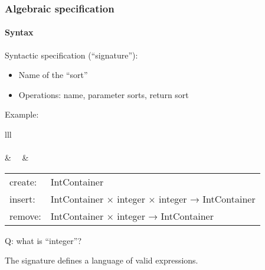 \documentclass{beamer}
\begin{document}
\begin{frame}[fragile]
\frametitle{Algebraic specification}
\framesubtitle{Syntax}

Syntactic specification (``signature''):
\begin{itemize}
\item Name of the ``sort''
\item Operations: name, parameter sorts, return sort
\end{itemize}
\bigskip

Example:
\begin{tabular}{lll}
\\
\\
 & \ \ & 
   \begin{tabular}{ll}
   create:& IntContainer\\
   insert:& IntContainer × integer × integer → IntContainer\\
   remove:& IntContainer × integer → IntContainer \\
   \end{tabular}
\end{tabular} 
\bigskip


Q: what is ``integer''?

The signature defines a language of valid expressions.


\end{frame}
\end{document}

